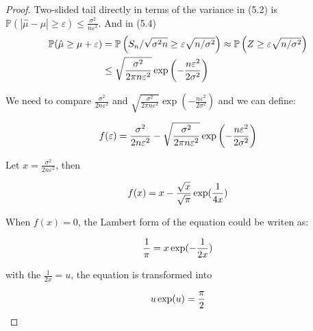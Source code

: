 \begin{proof}
	Two-slided tail directly in terms of the variance in (5.2) is $\mathbb{P}(|\hat{\mu}-\mu| \geq \varepsilon) \leq \frac{\sigma^{2}}{n \varepsilon^{2}}$. And in (5.4) 
	\begin{equation}
	\begin{aligned}
 	\notag
	\mathbb{P}(\hat{\mu} \geq \mu+\varepsilon) &=\mathbb{P}\left(S_{n} / \sqrt{\sigma^{2} n} \geq \varepsilon \sqrt{n / \sigma^{2}}\right) \approx \mathbb{P}\left(Z \geq \varepsilon \sqrt{n / \sigma^{2}}\right) \\
	& \leq \sqrt{\frac{\sigma^{2}}{2 \pi n \varepsilon^{2}}} \exp \left(-\frac{n \varepsilon^{2}}{2 \sigma^{2}}\right)
	\end{aligned}
	\end{equation}

	We need to compare $\frac {\sigma^2} {2 n \varepsilon^2}$ and $ \sqrt{\frac{\sigma^{2}}{2 \pi n \varepsilon^{2}}} \exp \left(-\frac{n \varepsilon^{2}}{2 \sigma^{2}}\right)$ and we can define:

	\begin{equation}
	\begin{aligned}
		 \notag
		f(\varepsilon) = \frac {\sigma^2} {2 n \varepsilon^2}- \sqrt{\frac{\sigma^{2}}{2 \pi n \varepsilon^{2}}} \exp \left(-\frac{n \varepsilon^{2}}{2 \sigma^{2}}\right)
	\end{aligned}	
	\end{equation}


	Let $x = \frac {\sigma ^2} {2 n \varepsilon^2}$, then 

	\begin{equation}
	\begin{aligned}
		 \notag
		f(x) = x - \frac {\sqrt {x}} {\sqrt{\pi}} \exp(\frac 1 {4 x})
	\end{aligned}
	\end{equation}


	When $f(x) = 0$, the Lambert form of the equation could be writen as:

	\begin{equation}
	\begin{aligned}
 	\notag
	\frac 1 \pi = x \exp(- \frac {1} {2x})
	\end{aligned}	
	\end{equation}

	with the $\frac 1 {2x} = u$, the equation is transformed into
	
	\begin{equation}
	\begin{aligned}
	\notag
	u \exp(u) = \frac {\pi} {2}
	\end{aligned}	
	\end{equation}


\end{proof}
